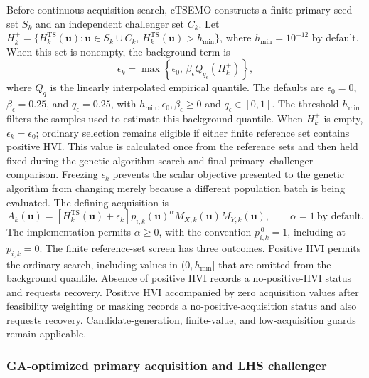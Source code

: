 \documentclass[twoside]{article}
\begin{document}
Before continuous acquisition search, cTSEMO constructs a finite primary seed
set \(S_k\) and an independent challenger set
\(C_k\).  Let
\(H_k^+=\{H_k^{\mathrm{TS}}(\mathbf{u}):
\mathbf{u}\in S_k\cup C_k,\,
H_k^{\mathrm{TS}}(\mathbf{u})>h_{\min}\}\), where \(h_{\min}=10^{-12}\) by
default.  When this set is nonempty, the background term is
\begin{equation}
  \epsilon_k=
  \max\!\left\{\epsilon_0,\,
  \beta_\epsilon
  Q_{q_\epsilon}\!\left(H_k^+\right)\right\},
  \label{eq:adaptive-background}
\end{equation}
where \(Q_q\) is the linearly interpolated empirical quantile.  The defaults
are \(\epsilon_0=0\), \(\beta_\epsilon=0.25\), and
\(q_\epsilon=0.25\), with \(h_{\min},\epsilon_0,\beta_\epsilon\geq0\) and
\(q_\epsilon\in[0,1]\). The threshold \(h_{\min}\) filters the samples used
to estimate this background quantile. When \(H_k^+\) is empty,
\(\epsilon_k=\epsilon_0\); ordinary selection remains eligible if either
finite reference set contains positive HVI. This value is calculated once from the reference sets
and then held fixed during the genetic-algorithm search and final
primary--challenger comparison.  Freezing \(\epsilon_k\) prevents the scalar
objective presented to the genetic algorithm from changing merely because a
different population batch is being evaluated.  The defining acquisition is
\begin{equation}
  A_k(\mathbf{u})=
  \left[H_k^{\mathrm{TS}}(\mathbf{u})+\epsilon_k\right]
  p_{i,k}(\mathbf{u})^{\alpha}
  M_{X,k}(\mathbf{u})M_{Y,k}(\mathbf{u}),
  \qquad \alpha=1\ \text{by default}.
  \label{eq:main-acquisition}
\end{equation}
The implementation permits \(\alpha\geq0\), with the convention
\(p_{i,k}^{\,0}=1\), including at \(p_{i,k}=0\).
The finite reference-set screen has three outcomes. Positive HVI permits the
ordinary search, including values in \((0,h_{\min}]\) that are omitted from the
background quantile. Absence of positive HVI records a no-positive-HVI status
and requests recovery. Positive HVI accompanied by zero acquisition values
after feasibility weighting or masking records a no-positive-acquisition
status and also requests recovery. Candidate-generation, finite-value, and
low-acquisition guards remain applicable.

\subsubsection{GA-optimized primary acquisition and LHS challenger}
\end{document}
